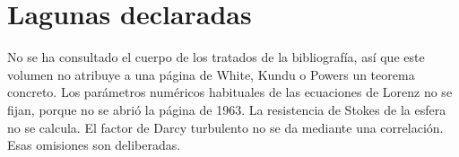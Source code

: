 \section{Lagunas declaradas}

No se ha consultado el cuerpo de los tratados de la bibliografía, así que este volumen no atribuye a una página de White, Kundu o Powers un teorema concreto. Los parámetros numéricos habituales de las ecuaciones de Lorenz no se fijan, porque no se abrió la página de 1963. La resistencia de Stokes de la esfera no se calcula. El factor de Darcy turbulento no se da mediante una correlación. Esas omisiones son deliberadas.
